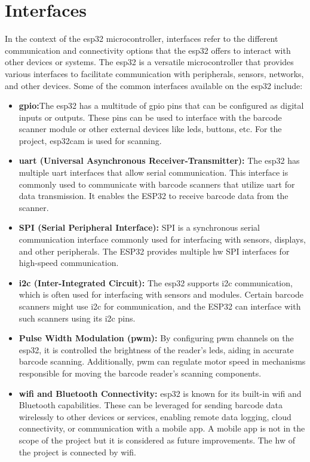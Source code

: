
\section{Interfaces}
In the context of the \ac{esp32} microcontroller, interfaces refer to the different communication and connectivity options that the \ac{esp32} offers to interact with other devices or systems. The \ac{esp32} is a versatile microcontroller that provides various interfaces to facilitate communication with peripherals, sensors, networks, and other devices. Some of the common interfaces available on the \ac{esp32} include:

\medskip

\begin{itemize}
    \item \textbf{\ac{gpio}:}The \ac{esp32} has a multitude of \ac{gpio} pins that can be configured as digital inputs or outputs. These pins can be used to interface with the barcode scanner module or other external devices like \ac{led}s, buttons, etc. For the project, \ac{esp32cam} is used for scanning.
    \item \textbf{\ac{uart} (Universal Asynchronous Receiver-Transmitter):} The \ac{esp32} has multiple \ac{uart} interfaces that allow serial communication. This interface is commonly used to communicate with barcode scanners that utilize \ac{uart} for data transmission. It enables the ESP32 to receive barcode data from the scanner.
    \item \textbf{SPI (Serial Peripheral Interface):} SPI is a synchronous serial communication interface commonly used for interfacing with sensors, displays, and other peripherals. The ESP32 provides multiple \ac{hw} SPI interfaces for high-speed communication.
    \item \textbf{\ac{i2c} (Inter-Integrated Circuit):} The \ac{esp32} supports \ac{i2c} communication, which is often used for interfacing with sensors and modules. Certain barcode scanners might use \ac{i2c} for communication, and the ESP32 can interface with such scanners using its \ac{i2c} pins. 
    \item \textbf{Pulse Width Modulation (\ac{pwm}):} By configuring \ac{pwm} channels on the \ac{esp32},  it is controlled the brightness of the reader's \ac{led}s, aiding in accurate barcode scanning. Additionally, \ac{pwm} can regulate motor speed in mechanisms responsible for moving the barcode reader's scanning components.
    \item \textbf{\ac{wifi} and Bluetooth Connectivity:} \ac{esp32} is known for its built-in \ac{wifi} and Bluetooth capabilities. These can be leveraged for sending barcode data wirelessly to other devices or services, enabling remote data logging, cloud connectivity, or communication with a mobile app. A mobile app is not in the scope of the project but it is considered as future improvements. The \ac{hw} of the project is connected by \ac{wifi}.
\end{itemize}

